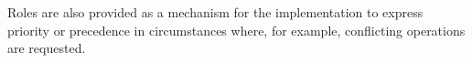
%

Roles are also provided as a mechanism for the implementation to express priority or precedence in circumstances where, for example, conflicting operations are requested. 


